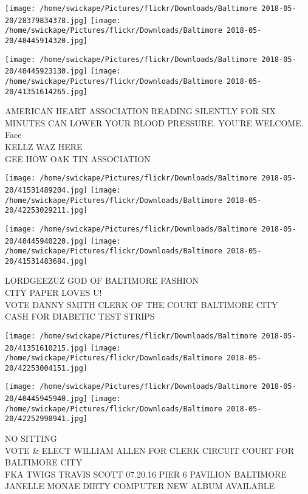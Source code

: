 \documentclass[10pt,letterpaper]{article}
\begin{document}
\texttt{[image: /home/swickape/Pictures/flickr/Downloads/Baltimore 2018-05-20/28379834378.jpg]}
\texttt{[image: /home/swickape/Pictures/flickr/Downloads/Baltimore 2018-05-20/40445914320.jpg]}

\texttt{[image: /home/swickape/Pictures/flickr/Downloads/Baltimore 2018-05-20/40445923130.jpg]}
\texttt{[image: /home/swickape/Pictures/flickr/Downloads/Baltimore 2018-05-20/41351614265.jpg]}

AMERICAN HEART ASSOCIATION READING SILENTLY FOR SIX MINUTES CAN LOWER YOUR BLOOD PRESSURE.  YOU'RE WELCOME.\\
Face\\
KELLZ WAZ HERE\\
GEE HOW OAK TIN ASSOCIATION
\pagebreak

\texttt{[image: /home/swickape/Pictures/flickr/Downloads/Baltimore 2018-05-20/41531489204.jpg]}
\texttt{[image: /home/swickape/Pictures/flickr/Downloads/Baltimore 2018-05-20/42253029211.jpg]}

\texttt{[image: /home/swickape/Pictures/flickr/Downloads/Baltimore 2018-05-20/40445940220.jpg]}
\texttt{[image: /home/swickape/Pictures/flickr/Downloads/Baltimore 2018-05-20/41531483684.jpg]}

LORDGEEZUZ GOD OF BALTIMORE FASHION\\
CITY PAPER LOVES U!\\
VOTE DANNY SMITH CLERK OF THE COURT BALTIMORE CITY\\
CASH FOR DIABETIC TEST STRIPS
\pagebreak

\texttt{[image: /home/swickape/Pictures/flickr/Downloads/Baltimore 2018-05-20/41351610215.jpg]}
\texttt{[image: /home/swickape/Pictures/flickr/Downloads/Baltimore 2018-05-20/42253004151.jpg]}

\texttt{[image: /home/swickape/Pictures/flickr/Downloads/Baltimore 2018-05-20/40445945940.jpg]}
\texttt{[image: /home/swickape/Pictures/flickr/Downloads/Baltimore 2018-05-20/42252998941.jpg]}

NO SITTING\\
VOTE \& ELECT WILLIAM ALLEN FOR CLERK CIRCUIT COURT FOR BALTIMORE CITY\\
FKA TWIGS TRAVIS SCOTT 07.20.16 PIER 6 PAVILION BALTIMORE\\
JANELLE MONAE DIRTY COMPUTER NEW ALBUM AVAILABLE
\pagebreak
\end{document}
